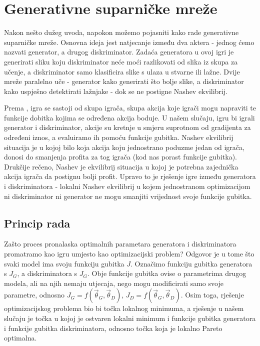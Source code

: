 \section{Generativne suparničke mreže}
Nakon nešto dužeg uvoda, napokon možemo pojasniti kako rade generativne suparničke mreže. Osnovna ideja jest natjecanje između dva aktera - jednog ćemo nazvati generator, a drugog diskriminator. Zadaća generatora u ovoj igri je generirati sliku koju diskriminator neće moći razlikovati od slika iz skupa za učenje, a diskriminator samo klasificira slike s ulaza u stvarne ili lažne. Dvije mreže paralelno uče - generator kako generirati što bolje slike, a diskriminator kako uspješno detektirati lažnjake - dok se ne postigne Nashev ekvilibrij.

Prema , igra se sastoji od skupa igrača, skupa akcija koje igrači mogu napraviti te funkcije dobitka kojima se određena akcija boduje. U našem slučaju, igru bi igrali generator i diskriminator, akcije su kretnje u smjeru suprotnom od gradijenta za određeni iznos, a evaluiramo ih pomoću funkcije gubitka. Nashev ekvilibrij  situacija je u kojoj bilo koja akcija koju jednostrano poduzme jedan od igrača, donosi do smanjenja profita za tog igrača (kod nas porast funkcije gubitka). Drukčije rečeno, Nashev je ekvilibrij situacija u kojoj je potrebna zajednička akcija igrača da postignu bolji profit. Upravo to je rješenje igre između generatora i diskriminatora - lokalni Nashev ekvilibrij  u kojem jednostranom optimizacijom ni diskriminator ni generator ne mogu smanjiti vrijednost svoje funkcije gubitka.

\subsection{Princip rada}
Zašto proces pronalaska optimalnih parametara generatora i diskriminatora promatramo kao igru umjesto kao optimizacijski problem? Odgovor je u tome što svaki model ima svoju funkciju gubitka $J$. Označimo funkciju gubitka generatora s $J_G$, a diskriminatora s $J_G$. Obje funkcije gubitka ovise o parametrima drugog modela, ali na njih nemaju utjecaja, nego mogu modificirati samo svoje parametre, odnosno
$J_G = f(\vec{\theta}_G, \vec{\theta}_D)$, $J_D =  f(\vec{\theta}_G, \vec{\theta}_D)$. Osim toga, rješenje optimizacijskog problema bio bi točka lokalnog minimuma, a rješenje u našem slučaju je točka u kojoj je ostvaren lokalni minimum i funkcije gubitka generatora i funkcije gubitka diskriminatora, odnosno točka koja je lokalno Pareto optimalna.

